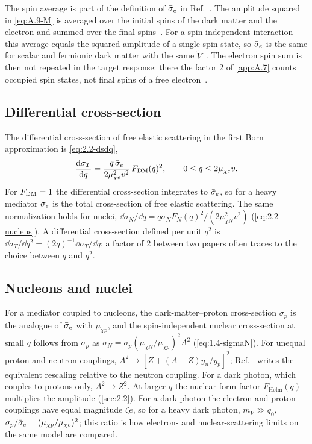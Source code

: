 The spin average is part of the definition of $\bar{\sigma}_{e}$ in Ref.~\cite[Eq.~(3.8)]{essig2016direct}. The amplitude squared in \cref{eq:A.9-M} is averaged over the initial spins of the dark matter and the electron and summed over the final spins~\cite[below Eq.~(3.8)]{essig2016direct}. For a spin-independent interaction this average equals the squared amplitude of a single spin state, so $\bar{\sigma}_{e}$ is the same for scalar and fermionic dark matter with the same $\tilde V$~\cite[below Eq.~(2.2)]{essig2016direct}. The electron spin sum is then not repeated in the target response: there the factor 2 of \cref{app:A.7} counts occupied spin states, not final spins of a free electron~\cite[below Eqs.~(A.28) and (A.29)]{essig2016direct}.

\subsection{Differential cross-section}

The differential cross-section of free elastic scattering in the first Born approximation is \cref{eq:2.2-dsdq},
\begin{equation*}
  \frac{\mathrm{d}\sigma_T}{\mathrm{d} q} = \frac{q\,\bar{\sigma}_{e}}{2\mu_{\chi e}^2v^2}\,F_{\mathrm{DM}}(q)^2, \qquad 0 \le q \le 2\mu_{\chi e}v .
\end{equation*}
For $F_{\mathrm{DM}} = 1$ the differential cross-section integrates to $\bar{\sigma}_{e}$, so for a heavy mediator $\bar{\sigma}_{e}$ is the total cross-section of free elastic scattering. The same normalization holds for nuclei, $\dd\sigma_N/\dd q = q\sigma_NF_N(q)^2/(2\mu_{\chi N}^2v^2)$ (\cref{eq:2.2-nucleus}). A differential cross-section defined per unit $q^2$ is $\dd\sigma_T/\dd q^2 = (2q)^{-1}\dd\sigma_T/\dd q$; a factor of 2 between two papers often traces to the choice between $q$ and $q^2$.

\subsection{Nucleons and nuclei}

For a mediator coupled to nucleons, the dark-matter--proton cross-section $\sigma_p$ is the analogue of $\bar{\sigma}_{e}$ with $\mu_{\chi p}$, and the spin-independent nuclear cross-section at small $q$ follows from $\sigma_p$ as $\sigma_N = \sigma_p(\mu_{\chi N}/\mu_{\chi p})^2A^2$ (\cref{eq:1.4-sigmaN}). For unequal proton and neutron couplings, $A^2 \to [Z + (A - Z)y_n/y_p]^2$; Ref.~\cite[Eq.~(104)]{lin2019tasi} writes the equivalent rescaling relative to the neutron coupling. For a dark photon, which couples to protons only, $A^2 \to Z^2$. At larger $q$ the nuclear form factor $F_{\mathrm{Helm}}(q)$ multiplies the amplitude (\cref{sec:2.2}). For a dark photon the electron and proton couplings have equal magnitude $\zeta e$, so for a heavy dark photon, $m_V \gg q_0$, $\sigma_p/\bar{\sigma}_{e} = (\mu_{\chi p}/\mu_{\chi e})^2$; this ratio is how electron- and nuclear-scattering limits on the same model are compared.

